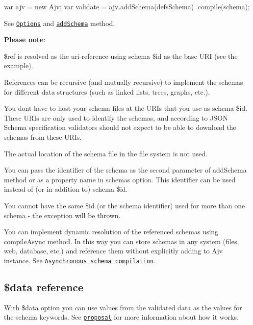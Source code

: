 \begin{DoxyCode}
var ajv = new Ajv;
var validate = ajv.addSchema(defsSchema)
                  .compile(schema);
\end{DoxyCode}


See \href{#options}{\tt Options} and \href{#api}{\tt add\+Schema} method.

{\bfseries Please note}\+:
\begin{DoxyItemize}
\item {\ttfamily \$ref} is resolved as the uri-\/reference using schema \$id as the base U\+RI (see the example).
\item References can be recursive (and mutually recursive) to implement the schemas for different data structures (such as linked lists, trees, graphs, etc.).
\item You don\textquotesingle{}t have to host your schema files at the U\+R\+Is that you use as schema \$id. These U\+R\+Is are only used to identify the schemas, and according to J\+S\+ON Schema specification validators should not expect to be able to download the schemas from these U\+R\+Is.
\item The actual location of the schema file in the file system is not used.
\item You can pass the identifier of the schema as the second parameter of {\ttfamily add\+Schema} method or as a property name in {\ttfamily schemas} option. This identifier can be used instead of (or in addition to) schema \$id.
\item You cannot have the same \$id (or the schema identifier) used for more than one schema -\/ the exception will be thrown.
\item You can implement dynamic resolution of the referenced schemas using {\ttfamily compile\+Async} method. In this way you can store schemas in any system (files, web, database, etc.) and reference them without explicitly adding to Ajv instance. See \href{#asynchronous-schema-compilation}{\tt Asynchronous schema compilation}.
\end{DoxyItemize}

\subsection*{\$data reference}

With {\ttfamily \$data} option you can use values from the validated data as the values for the schema keywords. See \href{https://github.com/json-schema/json-schema/wiki/$data-(v5-proposal)}{\tt proposal} for more information about how it works.

